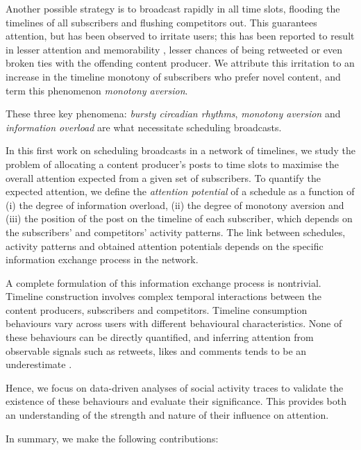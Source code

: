 \documentclass[onecolumn, 12 pt, doublespace, fullpage, letterpaper]{report}
\begin{document}
Another possible strategy is to broadcast rapidly in all time slots, flooding the timelines of all subscribers and flushing competitors out. This guarantees attention, but has been observed to irritate users; this has been reported to result in lesser attention and memorability \cite{counts2011taking}, lesser chances of being retweeted \cite{comarela2012understanding} or even broken ties \cite{kwak2011fragile} with the offending content producer. We attribute this irritation to an increase in the timeline monotony of subscribers who prefer novel content, and term this phenomenon \textit{monotony aversion}.

These three key phenomena: \textit{bursty circadian rhythms}, \textit{monotony aversion} and \textit{information overload} are what necessitate scheduling broadcasts.

In this first work on scheduling broadcasts in a network of timelines, we study the problem of allocating a content producer's posts to time slots to maximise the overall attention expected from a given set of subscribers. To quantify the expected attention, we define the \textit{attention potential} of a schedule as a function of (i) the degree of information overload, (ii) the degree of monotony aversion and (iii) the position of the post on the timeline of each subscriber, which depends on the subscribers' and competitors' activity patterns. The link between schedules, activity patterns and obtained attention potentials depends on the specific information exchange process in the network.

A complete formulation of this information exchange process is nontrivial. Timeline construction involves complex temporal interactions between the content producers, subscribers and competitors. Timeline consumption behaviours vary across users with different behavioural characteristics. None of these behaviours can be directly quantified, and inferring attention from observable signals such as retweets, likes and comments tends to be an underestimate \cite{Bernstein:2013:QIA:2470654.2470658}.

Hence, we focus on data-driven analyses of social activity traces to validate the existence of these behaviours and evaluate their significance. This provides both an understanding of the strength and nature of their influence on attention.

In summary, we make the following contributions:
\end{document}
